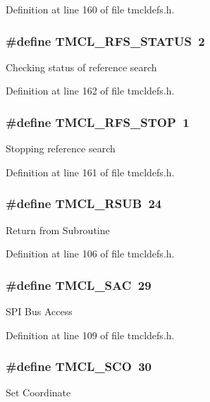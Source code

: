 Definition at line 160 of file tmcldefs.h.\hypertarget{group__TMCLComm_gadc8231e2815a936cb84f36f75da3ca02}{
\subsubsection[{TMCL\_\-RFS\_\-STATUS}]{\setlength{\rightskip}{0pt plus 5cm}\#define TMCL\_\-RFS\_\-STATUS~2}}
\label{group__TMCLComm_gadc8231e2815a936cb84f36f75da3ca02}
Checking status of reference search 

Definition at line 162 of file tmcldefs.h.\hypertarget{group__TMCLComm_gadad6e89adaf4b2c93c8afd785b3aeb29}{
\subsubsection[{TMCL\_\-RFS\_\-STOP}]{\setlength{\rightskip}{0pt plus 5cm}\#define TMCL\_\-RFS\_\-STOP~1}}
\label{group__TMCLComm_gadad6e89adaf4b2c93c8afd785b3aeb29}
Stopping reference search 

Definition at line 161 of file tmcldefs.h.\hypertarget{group__TMCLComm_gab5dbf5f5909e2c59d70ddf48dd6d68fe}{
\subsubsection[{TMCL\_\-RSUB}]{\setlength{\rightskip}{0pt plus 5cm}\#define TMCL\_\-RSUB~24}}
\label{group__TMCLComm_gab5dbf5f5909e2c59d70ddf48dd6d68fe}
Return from Subroutine 

Definition at line 106 of file tmcldefs.h.\hypertarget{group__TMCLComm_gaa5bb837c0debc7de9548dcd55f233cda}{
\subsubsection[{TMCL\_\-SAC}]{\setlength{\rightskip}{0pt plus 5cm}\#define TMCL\_\-SAC~29}}
\label{group__TMCLComm_gaa5bb837c0debc7de9548dcd55f233cda}
SPI Bus Access 

Definition at line 109 of file tmcldefs.h.\hypertarget{group__TMCLComm_ga98541d48d1c0ae966624414f02869164}{
\subsubsection[{TMCL\_\-SCO}]{\setlength{\rightskip}{0pt plus 5cm}\#define TMCL\_\-SCO~30}}
\label{group__TMCLComm_ga98541d48d1c0ae966624414f02869164}
Set Coordinate 

